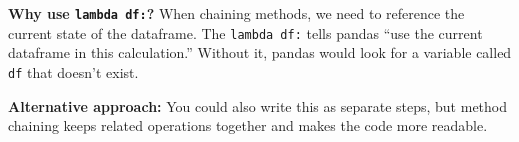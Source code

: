 \documentclass[
]{article}
\begin{document}
\begin{tcolorbox}[enhanced jigsaw, colbacktitle=quarto-callout-tip-color!10!white, toptitle=1mm, colframe=quarto-callout-tip-color-frame, bottomtitle=1mm, colback=white, left=2mm, breakable, coltitle=black, bottomrule=.15mm, rightrule=.15mm, titlerule=0mm, opacityback=0, title=\textcolor{quarto-callout-tip-color}{\faLightbulb}\hspace{0.5em}{💡 Method Chaining Tip for New Python Users}, arc=.35mm, opacitybacktitle=0.6, toprule=.15mm, leftrule=.75mm]

\textbf{Why use \texttt{lambda\ df:}?} When chaining methods, we need to
reference the current state of the dataframe. The \texttt{lambda\ df:}
tells pandas ``use the current dataframe in this calculation.'' Without
it, pandas would look for a variable called \texttt{df} that doesn't
exist.

\textbf{Alternative approach:} You could also write this as separate
steps, but method chaining keeps related operations together and makes
the code more readable.

\end{tcolorbox}
\end{document}
